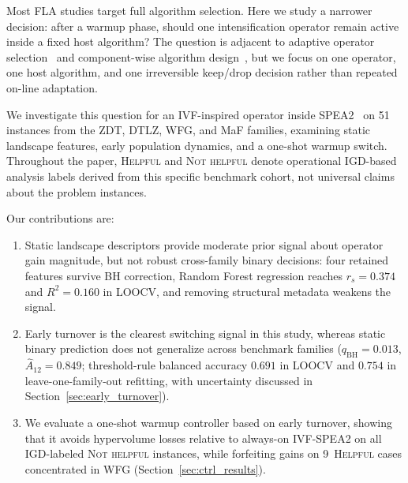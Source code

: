 \documentclass[conference]{IEEEtran}
\begin{document}
Most FLA studies target full algorithm selection. Here we study a narrower
decision: after a warmup phase, should one intensification operator remain
active inside a fixed host algorithm? The question is adjacent to adaptive
operator selection~\cite{fialho2008adaptive,maturana2009adaptive} and
component-wise algorithm design~\cite{bezerra2016automatic}, but we focus on
one operator, one host algorithm, and one irreversible keep/drop decision
rather than repeated on-line adaptation.

We investigate this question for an IVF-inspired operator inside
SPEA2~\cite{zitzler2001spea2} on 51 instances from the ZDT, DTLZ, WFG, and
MaF families, examining static landscape features, early population dynamics,
and a one-shot warmup switch. Throughout the paper, \textsc{Helpful} and
\textsc{Not helpful} denote operational IGD-based analysis labels derived from
this specific benchmark cohort, not universal claims about the problem
instances.

Our contributions are:
\begin{enumerate}
	\item Static landscape descriptors provide moderate prior signal about
	      operator gain magnitude, but not robust cross-family binary
	      decisions: four retained features survive BH correction, Random
	      Forest regression reaches $r_s = 0.374$ and $R^{2} = 0.160$ in
	      LOOCV, and removing structural metadata weakens the signal.
	\item Early turnover is the clearest switching signal in this study,
	      whereas static binary prediction does not generalize across
	      benchmark families
	      ($q_{\mathrm{BH}} = 0.013$, $\hat{A}_{12} = 0.849$; threshold-rule
	      balanced accuracy $0.691$ in LOOCV and $0.754$ in leave-one-family-out
	      refitting, with uncertainty discussed in
	      Section~\ref{sec:early_turnover}).
	\item We evaluate a one-shot warmup controller based on early turnover,
	      showing that it avoids hypervolume losses relative to always-on
	      IVF-SPEA2 on all IGD-labeled \textsc{Not helpful} instances, while
	      forfeiting gains on 9~\textsc{Helpful} cases concentrated in
	      WFG (Section~\ref{sec:ctrl_results}).
\end{enumerate}
\end{document}
